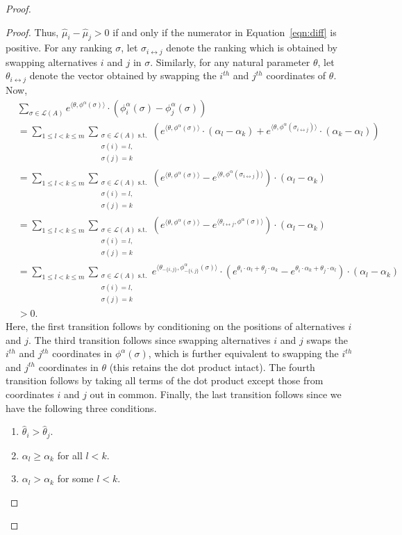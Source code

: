 \documentclass[10pt,letterpaper]{article}
\newcommand{\calL}{{\mathcal{L}}}
\newcommand{\rank}{{\calL(A)}}
\newcommand{\phia}{\phi^{\alpha}}
\newcommand{\muhat}{\hat{\mu}}
\newcommand{\that}{\hat{\theta}}
\begin{document}
\begin{proof}
\begin{proof}
Thus, $\muhat_i - \muhat_j > 0$ if and only if the numerator in Equation~\eqref{eqn:diff} is positive. For any ranking $\sigma$, let $\sigma_{i \leftrightarrow j}$ denote the ranking which is obtained by swapping alternatives $i$ and $j$ in $\sigma$. Similarly, for any natural parameter $\theta$, let $\theta_{i \leftrightarrow j}$ denote the vector obtained by swapping the $i^{th}$ and $j^{th}$ coordinates of $\theta$. Now,
\begin{align*}
&\sum_{\sigma \in \rank} e^{\langle \theta, \phia(\sigma) \rangle} \cdot (\phia_i(\sigma)-\phia_j(\sigma)) \\
&= \sum_{1 \le l < k \le m} \sum_{\substack{\sigma \in \rank \text{ s.t.}\\\sigma(i) = l,\\ \sigma(j) = k}} \left(e^{\langle \theta, \phia(\sigma) \rangle} \cdot (\alpha_l-\alpha_k) +  e^{\langle \theta, \phia(\sigma_{i \leftrightarrow j}) \rangle} \cdot (\alpha_k-\alpha_l) \right)  \\
&= \sum_{1 \le l < k \le m} \sum_{\substack{\sigma \in \rank \text{ s.t.}\\\sigma(i) = l,\\ \sigma(j) = k}} \left(e^{\langle \theta, \phia(\sigma) \rangle} - e^{\langle \theta, \phia(\sigma_{i \leftrightarrow j}) \rangle}\right) \cdot (\alpha_l-\alpha_k) \\
&= \sum_{1 \le l < k \le m} \sum_{\substack{\sigma \in \rank \text{ s.t.}\\\sigma(i) = l,\\ \sigma(j) = k}} \left(e^{\langle \theta, \phia(\sigma) \rangle} - e^{\langle \theta_{i \leftrightarrow j}, \phia(\sigma) \rangle}\right) \cdot (\alpha_l-\alpha_k) \\
&= \sum_{1 \le l < k \le m} \sum_{\substack{\sigma \in \rank \text{ s.t.}\\\sigma(i) = l,\\ \sigma(j) = k}} e^{\langle \theta_{-\{i,j\}}, \phia_{-\{i,j\}}(\sigma) \rangle} \cdot \left(e^{\theta_i \cdot \alpha_l + \theta_j \cdot \alpha_k} - e^{\theta_i \cdot \alpha_k + \theta_j \cdot \alpha_l}\right) \cdot (\alpha_l-\alpha_k) \\
& > 0.
\end{align*}
Here, the first transition follows by conditioning on the positions of alternatives $i$ and $j$. The third transition follows since swapping alternatives $i$ and $j$ swaps the $i^{th}$ and $j^{th}$ coordinates in $\phia(\sigma)$, which is further equivalent to swapping the $i^{th}$ and $j^{th}$ coordinates in $\theta$ (this retains the dot product intact). The fourth transition follows by taking all terms of the dot product except those from coordinates $i$ and $j$ out in common. Finally, the last transition follows since we have the following three conditions. 
\begin{enumerate}
\item $\that_i > \that_j$.
\item $\alpha_l \ge \alpha_k$ for all $l <k$. 
\item $\alpha_l > \alpha_k$ for some $l <k$. 
\end{enumerate}


\end{proof}
\end{proof}
\end{document}
